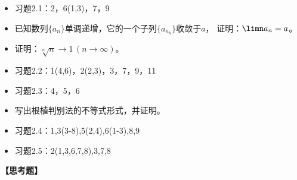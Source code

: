 \begin{itemize}
  \item 习题2.1：2，6(1,3)，7，9
  \item 已知数列$\{a_n\}$单调递增，它的一个子列$\{a_{n_k}\}$收敛于$a$，
  证明：$\limn a_n=a$。%
  \item 证明：$\sqrt[n]n\to 1\,(n\to\infty)$。
  \item 习题2.2：1(4,6)，2(2,3)，3，7，9，11
  \item 习题2.3：4，5，6
  \item 写出根植判别法的不等式形式，并证明。
  \item 习题2.4：1,3(3-8),5(2,4),6(1-3),8,9
  \item 习题2.5：2(1,3,6,7,8),3,7,8
\end{itemize}

{\bf 【思考题】}


